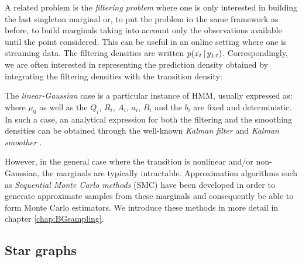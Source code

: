 A related problem is the \emph{filtering problem} where one is only interested in building the last singleton marginal or, to put the problem in the same framework as before, to build marginals taking into account only the observations available until the point considered. This can be useful in an online setting where one is streaming data. 
The filtering densities are written $p(x_t\,|\, y_{1:t})$. Correspondingly, we are often interested in representing the prediction density obtained by integrating the filtering densities with the transition density: 
%
%

The \emph{linear-Gaussian} case is a particular instance of HMM, usually expressed as:
where $\mu_0$ as well as the $Q_i$, $R_i$, $A_i$, $a_i$, $B_i$ and the $b_i$ are fixed and deterministic. In such a case, an analytical expression for both the filtering and the smoothing densities can be obtained through the well-known \emph{Kalman filter} and \emph{Kalman smoother} \citep{anderson79}. 

However, in the general case where the transition is nonlinear and/or non-Gaussian, the marginals are typically intractable. Approximation algorithms such as \emph{Sequential Monte Carlo methods} (SMC) have been developed in order to generate approximate samples from these marginals and consequently be able to form Monte Carlo estimators. We introduce these methods in more detail in chapter \ref{chap:BGsampling}.

\subsection{Star graphs}

